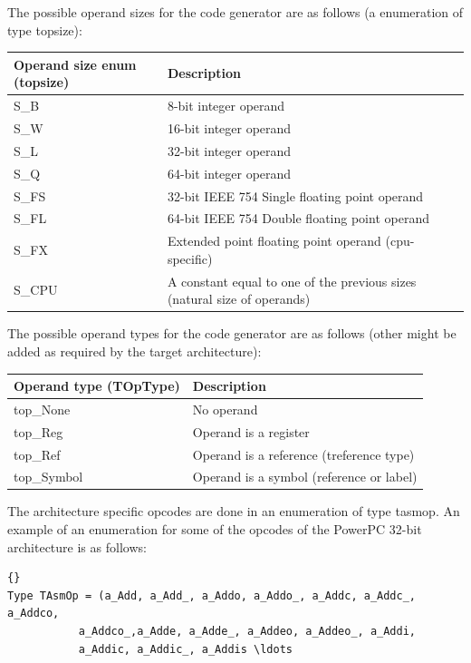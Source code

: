 \documentclass [a4paper,12pt]{article}
\begin{document}
The possible operand sizes for the code generator are as follows (a
enumeration of type \textsf{topsize}):

\begin{longtable}{|l|p{10cm}|}
\hline
Operand size enum (\textsf{topsize}) & Description \\
\hline
\endhead
\hline
\endfoot
\textsf{S{\_}B}& 			8-bit integer operand \\
\textsf{S{\_}W}& 			16-bit integer operand \\
\textsf{S{\_}L}& 			32-bit integer operand \\
\textsf{S{\_}Q}& 			64-bit integer operand \\
\textsf{S{\_}FS}& 			32-bit IEEE 754 Single floating point operand \\
\textsf{S{\_}FL}& 			64-bit IEEE 754 Double floating point operand \\
\textsf{S{\_}FX}& 			Extended point floating point operand (cpu-specific) \\
\textsf{S{\_}CPU}&			A constant equal to one of the previous sizes (natural size of operands) \\
\end{longtable}

The possible operand types for the code generator are as follows (other
might be added as required by the target architecture):

\begin{longtable}{|l|p{10cm}|}
\hline
Operand type (\textsf{TOpType}) & Description \\
\hline
\endhead
\hline
\endfoot
\textsf{top{\_}None}& 			No operand \\
\textsf{top{\_}Reg}& 			Operand is a register \\
\textsf{top{\_}Ref}& 			Operand is a reference (\textsf{treference} type) \\
\textsf{top{\_}Symbol}& 		Operand is a symbol (reference or label) \\
\end{longtable}

The architecture specific opcodes are done in an enumeration of type
\textsf{tasmop}. An example of an enumeration for some of the opcodes of the
PowerPC 32-bit architecture is as follows:

\begin{lstlisting}{}
Type TAsmOp = (a_Add, a_Add_, a_Addo, a_Addo_, a_Addc, a_Addc_, a_Addco,
	       a_Addco_,a_Adde, a_Adde_, a_Addeo, a_Addeo_, a_Addi,
	       a_Addic, a_Addic_, a_Addis \ldots
\end{lstlisting}
\end{document}
